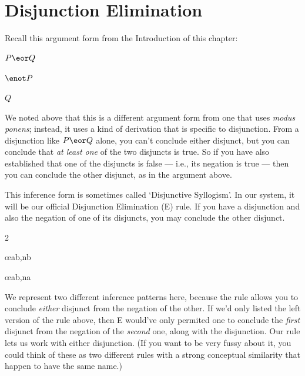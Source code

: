 \section{Disjunction Elimination}

Recall this argument form from the Introduction of this chapter:

\begin{earg}
\item[] $P \eor Q$
\item[] $\enot P$
\item[\therefore] $Q$
\end{earg}

We noted above that this is a different argument form from one that uses \emph{modus ponens}; instead, it uses a kind of derivation that is specific to disjunction. From a disjunction like $P \eor Q$ alone, you can't conclude either disjunct, but you can conclude that \emph{at least one} of the two disjuncts is true. So if you have also established that one of the disjuncts is false --- i.e., its negation is true --- then you can conclude the other disjunct, as in the argument above.

This inference form is sometimes called `Disjunctive Syllogism'. In our system, it will be our official Disjunction Elimination ({\eor}E) rule. If you have a disjunction and also the negation of one of its disjuncts, you may conclude the other disjunct.

\begin{multicols}{2}
\begin{ndproof}
	\metaA{} \oe{ab,nb}
\end{ndproof}

\begin{ndproof}
	\metaB{} \oe{ab,na}
\end{ndproof}

\end{multicols}

We represent two different inference patterns here, because the rule allows you to conclude \emph{either} disjunct from the negation of the other. If we'd only listed the left version of the rule above, then {\eor}E would've only permited one to conclude the \emph{first} disjunct from the negation of the \emph{second} one, along with the disjunction. Our rule lets us work with either disjunction. (If you want to be very fussy about it, you could think of these as two different rules with a strong conceptual similarity that happen to have the same name.)

